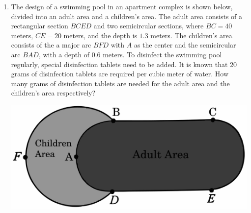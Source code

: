 \documentclass{report}
\begin{document}
\begin{enumerate}
	\item The design of a swimming pool in an apartment complex is shown below, divided into an adult area and a children's area. The adult area consists of a rectangular section $BCED$ and two semicircular sections, where $BC = 40$ meters, $CE = 20$ meters, and the depth is $1.3$ meters. The children's area consists of the a major arc $BFD$ with $A$ as the center and the semicircular arc $BAD$, with a depth of $0.6$ meters. To disinfect the swimming pool regularly, special disinfection tablets need to be added. It is known that 20 grams of disinfection tablets are required per cubic meter of water. How many grams of disinfection tablets are needed for the adult area and the children's area respectively?
	      \begin{center}
	      	\includegraphics[scale=0.15]{assets/8-36.png}
	      \end{center}
	      
\end{enumerate}
\end{document}
